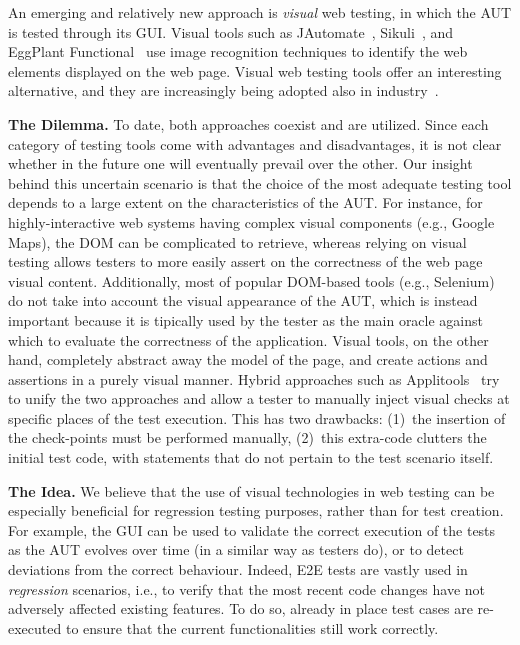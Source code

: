 An emerging and relatively new approach is \textit{visual} web testing, in which the AUT is tested through its GUI. 
Visual tools such as JAutomate~\cite{Alegroth2013jat}, Sikuli~\cite{Sikuli}, and EggPlant Functional~\cite{eggplant} use image recognition techniques to identify the web elements displayed on the web page. Visual web testing tools offer an interesting alternative, and they are increasingly being adopted also in industry~\cite{Alegroth2013jat}. 

\noindent
\textbf{The Dilemma.}
To date, both approaches coexist and are utilized. Since each category of testing tools come with advantages and disadvantages, it is not clear whether in the future one will eventually prevail over the other. Our insight behind this uncertain scenario is that the choice of the most adequate testing tool depends to a large extent on the characteristics of the AUT. For instance, for highly-interactive web systems having complex visual components (e.g., Google Maps), the DOM can be complicated to retrieve, whereas relying on visual testing allows testers to more easily assert on the correctness of the web page visual content.
Additionally, most of popular DOM-based tools (e.g., Selenium) do not take into account the visual appearance of the AUT, which is instead important because it is tipically used by the tester as the main oracle against which to evaluate the correctness of the application. Visual tools, on the other hand, completely abstract away the model of the page, and create actions and assertions in a purely visual manner. 
%
Hybrid approaches such as Applitools~\cite{applitools} try to unify the two approaches and allow a tester to manually inject visual checks at specific places of the test execution. This has two drawbacks: (1)~the insertion of the check-points must be performed manually, (2)~this extra-code clutters the initial test code, with statements that do not pertain to the test scenario itself.

\noindent
\textbf{The Idea.}
We believe that the use of visual technologies in web testing can  be especially beneficial for regression testing purposes, rather than for test creation. For example, the GUI can be used to validate the correct execution of the tests as the AUT evolves over time (in a similar way as testers do), or to detect deviations from the correct behaviour.
Indeed, E2E tests are vastly used in \textit{regression} scenarios, i.e., to verify that the most recent code changes have not adversely affected existing features. To do so, already in place test cases are re-executed to ensure that the current functionalities still work correctly. 
%

